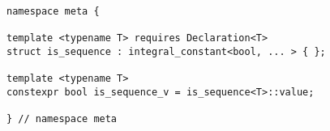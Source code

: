 
\begin{verbatim}
namespace meta {

template <typename T> requires Declaration<T>
struct is_sequence : integral_constant<bool, ... > { };

template <typename T>
constexpr bool is_sequence_v = is_sequence<T>::value;

} // namespace meta
\end{verbatim}
